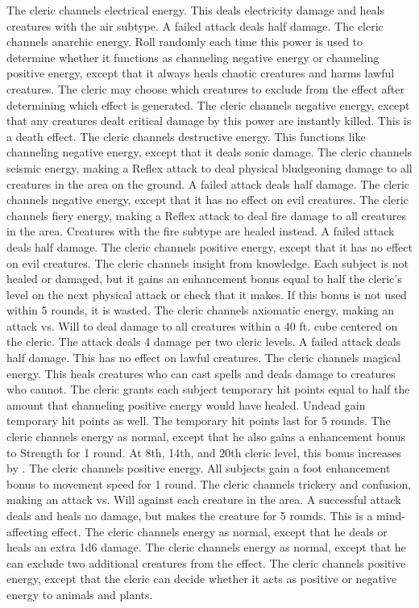  The cleric channels electrical energy. This deals electricity damage and heals creatures with the air subtype. A failed attack deals half damage.
 The cleric channels anarchic energy. Roll randomly each time this power is used to determine whether it functions as channeling negative energy or channeling positive energy, except that it always heals chaotic creatures and harms lawful creatures. The cleric may choose which creatures to exclude from the effect after determining which effect is generated.
 The cleric channels negative energy, except that any creatures dealt critical damage by this power are instantly killed. This is a death effect.
 The cleric channels destructive energy. This functions like channeling negative energy, except that it deals sonic damage.
 The cleric channels seismic energy, making a Reflex attack to deal physical bludgeoning damage to all creatures in the area on the ground. A failed attack deals half damage.
 The cleric channels negative energy, except that it has no effect on evil creatures.
 The cleric channels fiery energy, making a Reflex attack to deal fire damage to all creatures in the area. Creatures with the fire subtype are healed instead. A failed attack deals half damage.
 The cleric channels positive energy, except that it has no effect on evil creatures.
 The cleric channels insight from knowledge. Each subject is not healed or damaged, but it gains an enhancement bonus equal to half the cleric's level on the next physical attack or check that it makes. If this bonus is not used within 5 rounds, it is wasted.
 The cleric channels axiomatic energy, making an attack vs. Will to deal damage to all creatures within a 40 ft. cube centered on the cleric. The attack deals 4 damage per two cleric levels. A failed attack deals half damage. This has no effect on lawful creatures.
 The cleric channels magical energy. This heals creatures who can cast spells and deals damage to creatures who cannot.
 The cleric grants each subject temporary hit points equal to half the amount that channeling positive energy would have healed. Undead gain temporary hit points as well. The temporary hit points last for 5 rounds.
 The cleric channels energy as normal, except that he also gains a  enhancement bonus to Strength for 1 round. At 8th, 14th, and 20th cleric level, this bonus increases by . 
 The cleric channels positive energy. All subjects gain a  foot enhancement bonus to movement speed for 1 round.
 The cleric channels trickery and confusion, making an attack vs. Will against each creature in the area. A successful attack deals and heals no damage, but makes the creature \bewildered for 5 rounds. This is a mind-affecting effect.
 The cleric channels energy as normal, except that he deals or heals an extra 1d6 damage.
 The cleric channels energy as normal, except that he can exclude two additional creatures from the effect.
 The cleric channels positive energy, except that the cleric can decide whether it acts as positive or negative energy to animals and plants.

